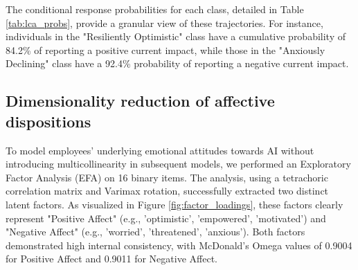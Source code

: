 \documentclass[]{article}
\begin{document}
The conditional response probabilities for each class, detailed in Table \ref{tab:lca_probs}, provide a granular view of these trajectories. For instance, individuals in the "Resiliently Optimistic" class have a cumulative probability of 84.2\% of reporting a positive current impact, while those in the "Anxiously Declining" class have a 92.4\% probability of reporting a negative current impact.

\begin{table}[t]
\centering
\caption{LCA Class Sizes and Conditional Response Probabilities for the 3-Class Solution.}
\label{tab:lca_probs}
\end{table}

\subsection{Dimensionality reduction of affective dispositions}
To model employees' underlying emotional attitudes towards AI without introducing multicollinearity in subsequent models, we performed an Exploratory Factor Analysis (EFA) on 16 binary items. The analysis, using a tetrachoric correlation matrix and Varimax rotation, successfully extracted two distinct latent factors. As visualized in Figure \ref{fig:factor_loadings}, these factors clearly represent "Positive Affect" (e.g., 'optimistic', 'empowered', 'motivated') and "Negative Affect" (e.g., 'worried', 'threatened', 'anxious'). Both factors demonstrated high internal consistency, with McDonald's Omega values of 0.9004 for Positive Affect and 0.9011 for Negative Affect.
\end{document}
